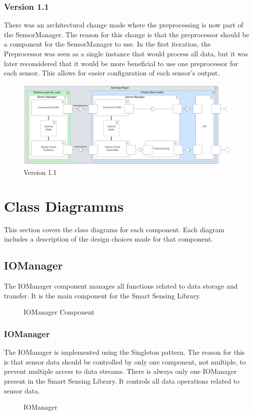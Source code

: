 \documentclass[12pt]{article}
\begin{document}
\subsubsection{Version 1.1}
There was an architectural change made where the preprocessing is now part of the SensorManager. The reason for this change is that the preprocessor should be a component for the SensorManager to use. In the first iteration, the Preprocessor was seen as a single instance that would process all data, but it was later reconsidered that it would be more beneficial to use one preprocessor for each sensor. This allows for easier configuration of each sensor's output.
\begin{figure}[ht]
\includegraphics[width=1\textwidth]{Graphics/SmartSensingPluginNew.png}
\caption{\label{fig:bild4} Version 1.1}
\end{figure}

\newpage
\section{Class Diagramms}
This section covers the class diagrams for each component. Each diagram includes a description of the design choices made for that component.

\subsection{IOManager}
The IOManager component manages all functions related to data storage and transfer. It is the main component for the Smart Sensing Library.
\begin{figure}[ht]
\centering

\caption{\label{fig:bild5} IOManager Component}
\end{figure}


\subsubsection{IOManager}
The IOManager is implemented using the Singleton pattern. The reason for this is that sensor data should be controlled by only one component, not multiple, to prevent multiple access to data streams. There is always only one IOManager present in the Smart Sensing Library. It controls all data operations related to sensor data.
\begin{figure}[ht]
\centering

\caption{\label{fig:bild6} IOManager}
\end{figure}
\end{document}
